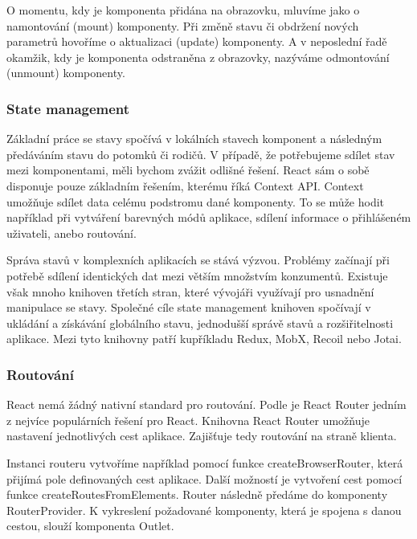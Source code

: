 O momentu, kdy je komponenta přidána na obrazovku, mluvíme jako o namontování (mount) komponenty. Při změně stavu či obdržení nových parametrů hovoříme o aktualizaci (update) komponenty. 
A v neposlední řadě okamžik, kdy je komponenta odstraněna z obrazovky, nazýváme odmontování (unmount) komponenty.\cite{reactlifecycle, react}

\subsubsection{State management}

Základní práce se stavy spočívá v lokálních stavech komponent a následným předáváním stavu do potomků či rodičů. 
V případě, že potřebujeme sdílet stav mezi komponentami, měli bychom zvážit odlišné řešení. React sám o sobě disponuje pouze základním řešením, kterému říká Context API. 
Context umožňuje sdílet data celému podstromu dané komponenty. 
To se může hodit například při vytváření barevných módů aplikace, sdílení informace o přihlášeném uživateli, anebo routování.\cite{react}

Správa stavů v komplexních aplikacích se stává výzvou. Problémy začínají při potřebě sdílení identických dat mezi větším množstvím konzumentů. 
Existuje však mnoho knihoven třetích stran, které vývojáři využívají pro usnadnění manipulace se stavy. 
Společné cíle state management knihoven spočívají v ukládání a získávání globálního stavu, jednodušší správě stavů a rozšiřitelnosti aplikace.
Mezi tyto knihovny patří kupříkladu Redux, MobX, Recoil nebo Jotai.\cite{statemanagementreact,reactstatemanagement}

\subsubsection{Routování}

React nemá žádný nativní standard pro routování. Podle \cite{reactbanks} je React Router jedním z nejvíce populárních řešení pro React. 
Knihovna React Router umožňuje nastavení jednotlivých cest aplikace. Zajišťuje tedy routování na straně klienta.

Instanci routeru vytvoříme například pomocí funkce createBrowserRouter, která přijímá pole definovaných cest aplikace. 
Další možností je vytvoření cest pomocí funkce createRoutesFromElements. Router následně předáme do komponenty RouterProvider. 
K vykreslení požadované komponenty, která je spojena s danou cestou, slouží komponenta Outlet.\cite{reactbanks,reactrouter}

